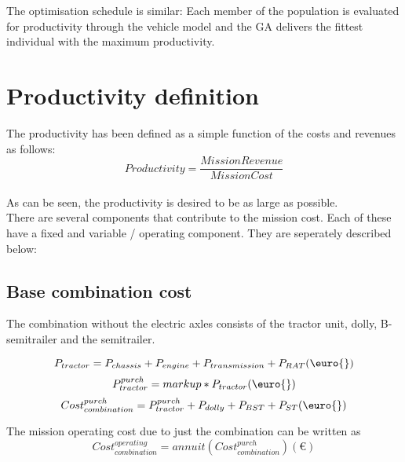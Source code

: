 \documentclass[ExampleMasters.tex]{subfiles}
\begin{document}
		The optimisation schedule is similar: Each member of the population is evaluated for productivity through the vehicle model and the GA delivers the fittest individual with the maximum productivity.\\

		\pagebreak

	\section{Productivity definition}

		The productivity has been defined as a simple function of the costs and revenues as follows:\\

		\begin{equation}
			Productivity = \frac{Mission Revenue}{Mission Cost}
		\end{equation}\\

		As can be seen, the productivity is desired to be as large as possible.\\

		There are several components that contribute to the mission cost. Each of these have a fixed and variable / operating component. They are seperately described below:\\

		\subsection{Base combination cost}

			The combination without the electric axles consists of the tractor unit, dolly, B-semitrailer and the semitrailer. 

			\begin{equation}
				P_{tractor} = P_{chassis}+P_{engine}+P_{transmission}+P_{RAT}  (\euro{})\\
			\end{equation}
			\begin{equation}
				P_{tractor}^{purch}= markup*P_{tractor} (\euro{})\\
			\end{equation}
			\begin{equation}
				Cost_{combination}^{purch} = P_{tractor}^{purch}+P_{dolly}+P_{BST}+P_{ST} (\euro{})\\
			\end{equation}

			The mission operating cost due to just the combination can be written as 
			\begin{equation}
				Cost_{combination}^{operating} = annuit(Cost_{combination}^{purch}) (\euro{})
			\end{equation}
\end{document}
